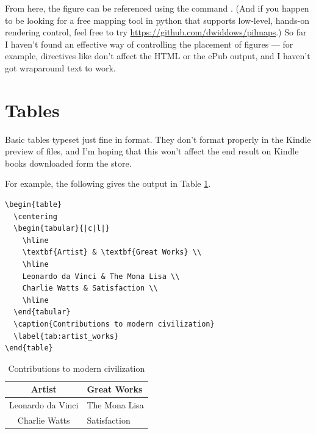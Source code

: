 From here, the figure can be referenced using the command 
. (And if you happen to be looking for a free mapping tool in python that
supports low-level, hands-on rendering control, feel free to try {\small \url{https://github.com/dwiddows/pilmaps}}.) 
So far I haven't found an effective way of controlling the placement of figures --- for example, directives
like  don't affect the HTML or the ePub output, and I haven't got
wraparound text to work.

\section{Tables}

Basic tables typeset just fine in  format. They don't format properly in the Kindle preview of  files,
and I'm hoping that this won't affect the end result on Kindle   books downloaded form the store.

For example, the following \latex gives the output in Table \ref{tab:artist_works}.

\begin{verbatim}
\begin{table}
  \centering
  \begin{tabular}{|c|l|}
    \hline
    \textbf{Artist} & \textbf{Great Works} \\
    \hline
    Leonardo da Vinci & The Mona Lisa \\
    Charlie Watts & Satisfaction \\
    \hline
  \end{tabular}
  \caption{Contributions to modern civilization}
  \label{tab:artist_works}
\end{table}
\end{verbatim}

\begin{table}
 \begin{center}
  \begin{tabular}{|c|l|}
    \hline
    \textbf{Artist} & \textbf{Great Works} \\
    \hline
    Leonardo da Vinci & The Mona Lisa \\
    Charlie Watts & Satisfaction \\
    \hline
  \end{tabular}
  \caption{Contributions to modern civilization}
  \label{tab:artist_works}
 \end{center}
\end{table}

